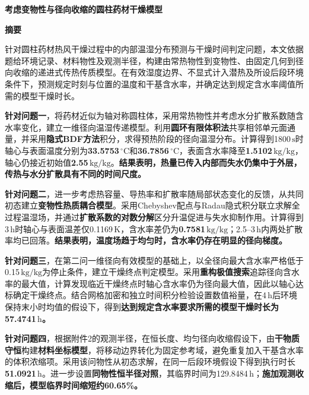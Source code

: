 \documentclass[UTF8,a4paper,zihao=-4,fontset=windows]{ctexart}
\newcommand{\unit}[1]{\ensuremath{\,\mathrm{#1}}}
\newcommand{\celsius}{\ensuremath{\,{}^\circ\mathrm{C}}}
\begin{document}
\begin{center}
{\LARGE\bfseries 考虑变物性与径向收缩的圆柱药材干燥模型\par}
\vspace{0.7em}
{\large\bfseries 摘\quad 要}
\end{center}
\begingroup
\linespread{1}\fontsize{11.5}{18}\selectfont
\setlength{\parindent}{2em}
\setlength{\parskip}{5pt}
\noindent\hspace*{2em}针对圆柱药材热风干燥过程中的内部温湿分布预测与干燥时间判定问题，本文依据题给环境记录、材料物性及观测半径，构建由常热物性到变物性、由固定几何到径向收缩的递进式传热传质模型。在有效湿度边界、不显式计入潜热及所设后段环境条件下，预测规定时刻与位置的温度和干基含水率，并确定达到规定含水率阈值所需的模型干燥时长。

\textbf{针对问题一}，将药材近似为轴对称圆柱体，采用常热物性并考虑水分扩散系数随含水率变化，建立一维径向温湿传递模型。利用\textbf{圆环有限体积法}共享相邻单元面通量，并采用\textbf{隐式BDF方法}积分，求得预热阶段的径向温湿分布。计算得到1800\unit{s}时轴心与表面温度分别为\textbf{33.5753\celsius}和\textbf{36.7856\celsius}，表面含水率降至\textbf{1.5102\unit{kg/kg}}，轴心仍接近初始值\textbf{2.55\unit{kg/kg}}。\textbf{结果表明，热量已传入内部而失水仍集中于外层，传热与水分扩散具有不同的时间尺度。}

\textbf{针对问题二}，进一步考虑热容量、导热率和扩散率随局部状态变化的反馈，从共同初态建立\textbf{变物性热质耦合模型}。采用Chebyshev配点与Radau隐式积分联立求解全过程温湿场，并通过\textbf{扩散系数的对数分解}区分升温促进与失水抑制作用。计算得到3\unit{h}时轴心与表面温差仅0.1169\unit{K}，含水率差仍为\textbf{0.7581\unit{kg/kg}}；2.5--3\unit{h}内两处扩散率均已回落。\textbf{结果表明，温度场趋于均匀时，含水率仍存在明显的径向梯度。}

\textbf{针对问题三}，在第二问一维径向有效模型的基础上，以全径向最大含水率严格低于0.15\unit{kg/kg}为停止条件，建立干燥终点判定模型。采用\textbf{重构极值搜索}追踪径向含水率的最大值，计算发现临近干燥终点时轴心含水率仍为径向最大值，因此以轴心达标确定干燥终点。结合网格加密和独立时间积分检验设置数值裕量，在4\unit{h}后环境保持末小时均值的假设下，得到\textbf{达到规定含水率要求所需的模型干燥时长为57.4741\unit{h}。}

\textbf{针对问题四}，根据附件2的观测半径，在恒长度、均匀径向收缩假设下，由\textbf{干物质守恒}构建\textbf{材料坐标模型}，将移动边界转化为固定参考域，避免重复加入干基含水率的体积浓缩项。采用该问物性从初态求解，在同一后段环境假设下得到执行时长\textbf{51.0921\unit{h}}。进一步设置\textbf{同物性恒半径对照}，其临界时间为129.8484\unit{h}；\textbf{施加观测收缩后，模型临界时间缩短约60.65\%。}
\end{document}
